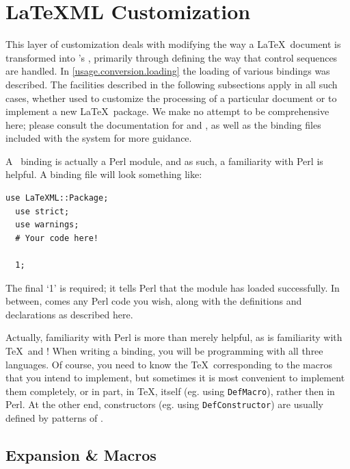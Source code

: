 \documentclass{book}
\newcommand{\ltxcode}{\lstinline[style=inlinelatexml]}
\begin{document}
\section{LaTeXML Customization}\label{customization.latexml}
This layer of customization deals with modifying the way a \LaTeX\ document
is transformed into \LaTeXML's \XML, primarily through defining the way
that control sequences are handled.
In \ref{usage.conversion.loading} the loading of various bindings was
described.  The facilities described in the following subsections
apply in all such cases, whether used to customize the processing
of a particular document or to implement a new \LaTeX\ package.
We make no attempt to be comprehensive here; please consult
the documentation for  and ,
as well as the binding files included with the system
for more guidance.

A \LaTeXML\ binding is actually a Perl module, and as such, 
a familiarity with Perl is helpful.
A binding file will look something like:
\begin{lstlisting}[style=latexml]
  use LaTeXML::Package;
  use strict;
  use warnings;
  # Your code here!

  1;
\end{lstlisting}
The final `1' is required; it tells Perl that the module has loaded successfully.
In between, comes any Perl code you wish, along with the definitions
and declarations as described here.

Actually, familiarity with Perl is more than merely helpful, as is familiarity
with \TeX\ and \XML! When writing a binding, you will be programming with all
three languages.  Of course, you need to know the \TeX\ corresponding to
the macros that you intend to implement, but sometimes it is most convenient
to implement them completely, or in part, in \TeX, itself (eg. using \ltxcode|DefMacro|),
rather then in Perl. At the other end, constructors (eg. using \ltxcode|DefConstructor|)
are usually defined by patterns of \XML.

\subsection[Expansion]{Expansion \& Macros}\label{customization.latexml.expansion}
\end{document}
